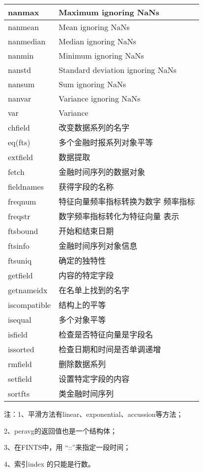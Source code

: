 \begin{longtable}{|l|l|}
            nanmax & Maximum ignoring NaNs\\\hline
            nanmean & Mean ignoring NaNs\\\hline
            nanmedian & Median ignoring NaNs\\\hline
            nanmin & Minimum ignoring NaNs\\\hline
            nanstd & Standard deviation ignoring NaNs\\\hline
            nansum & Sum ignoring NaNs\\\hline
            nanvar & Variance ignoring NaNs\\\hline
            var & Variance\\\hline
            chfield & 改变数据系列的名字\\\hline
            eq(fts) & 多个金融时报系列对象平等\\\hline
            extfield & 数据提取\\\hline
            fetch & 金融时间序列的数据对象\\\hline
            fieldnames & 获得字段的名称\\\hline
            freqnum & 特征向量频率指标转换为数字 频率指标\\\hline
            freqstr & 数字频率指标转化为特征向量 表示\\\hline
            ftsbound& 开始和结束日期\\\hline
            ftsinfo  & 金融时间序列对象信息\\\hline
            ftsuniq & 确定的独特性\\\hline
            getfield & 内容的特定字段\\\hline
            getnameidx  &在名单上找到的名字\\\hline
            iscompatible & 结构上的平等\\\hline
            isequal & 多个对象平等\\\hline
            isfield & 检查是否特征向量是字段名\\\hline
            issorted & 检查日期和时间是否单调递增\\\hline
            rmfield &  删除数据系列\\\hline
            setfield & 设置特定字段的内容\\\hline
            sortfts  & 类金融时间序列\\\hline
            \end{longtable}
            \noindent
            注：1、平滑方法有linear、exponential、accussion等方法；
            \par
            2、peravg的返回值也是一个结构体；
            \par
            3、在FINTS中，用 “::”来指定一段时间；
            \par
            4、索引index 的只能是行数。

